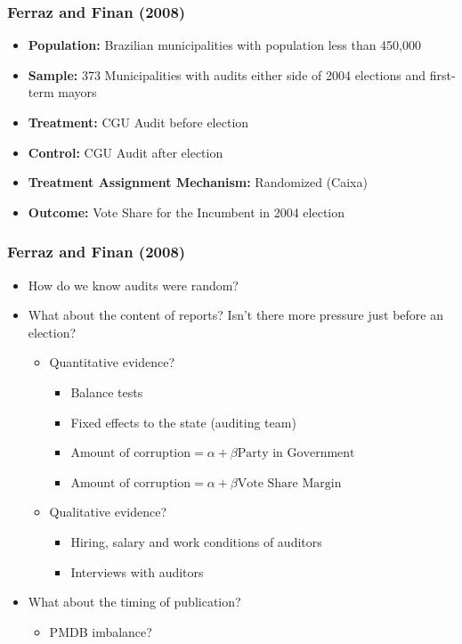 \documentclass[xcolor=x11names,compress]{beamer}\usepackage[]{graphicx}\usepackage[]{color}
\renewcommand{\(}{\begin{columns}}
\renewcommand{\)}{\end{columns}}
\newcommand{\<}[1]{\begin{column}{#1}}
\renewcommand{\>}{\end{column}}
\begin{document}
\begin{frame}
\frametitle{Ferraz and Finan (2008)}
\begin{itemize}
\item \textbf{Population:} Brazilian municipalities with population less than 450,000
\item \textbf{Sample:} 373 Municipalities with audits either side of 2004 elections and first-term mayors
\item \textbf{Treatment:} CGU Audit before election
\item \textbf{Control:} CGU Audit after election
\item \textbf{Treatment Assignment Mechanism:} Randomized (Caixa)
\item \textbf{Outcome:} Vote Share for the Incumbent in 2004 election
\end{itemize}
\end{frame}

\begin{frame}
\frametitle{Ferraz and Finan (2008)}
\begin{itemize}
\item How do we know audits were random?
\pause
\item What about the content of reports? Isn't there more pressure just before an election?
\pause
\begin{itemize}
\item Quantitative evidence?
\pause
\begin{itemize}
\item Balance tests
\pause
\item Fixed effects to the state (auditing team)
\pause
\item $\text{Amount of corruption} = \alpha + \beta \text{Party in Government}$
\pause
  \item $\text{Amount of corruption} = \alpha + \beta \text{Vote Share Margin}$
\end{itemize}
\pause
\item Qualitative evidence?
\pause
\begin{itemize}
\item Hiring, salary and work conditions of auditors
\pause
\item Interviews with auditors
\pause
\end{itemize}
\end{itemize}
\item What about the timing of publication?
\pause
\begin{itemize}
\item PMDB imbalance?
\end{itemize}
\end{itemize}
\end{frame}
\end{document}
